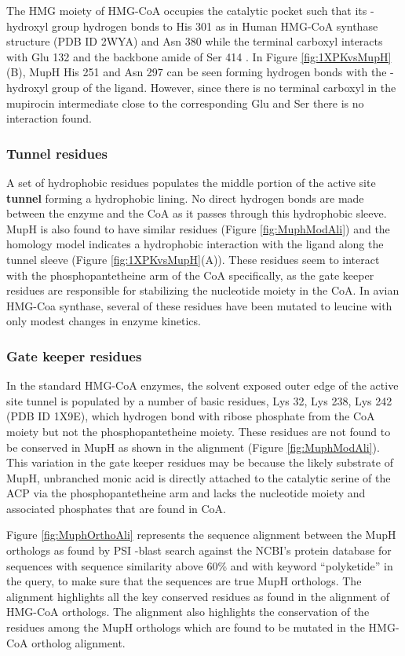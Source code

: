 		The HMG moiety of HMG-CoA occupies the catalytic pocket such that its \bet-hydroxyl group hydrogen bonds to His 301 as in Human HMG-CoA synthase structure (PDB ID 2WYA) and Asn 380 while the terminal carboxyl interacts with Glu 132 and the backbone amide of Ser 414 \parencite{Shafqat2010}. In Figure \ref{fig:1XPKvsMupH}(B), MupH His 251 and Asn 297 can be seen forming hydrogen bonds with the \bet-hydroxyl group of the ligand. However, since there is no terminal carboxyl in the mupirocin intermediate close to the corresponding Glu and Ser there is no interaction found.
		
		\subsubsection{Tunnel residues}
		\label{sec:tunnelresidues}
		A set of hydrophobic residues populates the middle portion of the active site \textbf{tunnel} forming a hydrophobic lining. No direct hydrogen bonds are made between the enzyme and the CoA as it passes through this hydrophobic sleeve. MupH is also found to have similar residues (Figure \ref{fig:MuphModAli}) and the homology model indicates a hydrophobic interaction with the ligand along the tunnel sleeve (Figure \ref{fig:1XPKvsMupH}(A)). These residues seem to interact with the phosphopantetheine arm of the CoA specifically, as the gate keeper residues are responsible for stabilizing the nucleotide moiety in the CoA. In avian HMG-Coa synthase, several of these residues have been mutated to leucine with only modest changes in enzyme kinetics. 
		
		\subsubsection{Gate keeper residues}
		\label{sec:gatekeeperresidues}
		In the standard HMG-CoA enzymes, the solvent exposed outer edge of the active site tunnel is populated by a number of basic residues, Lys 32, Lys 238, Lys 242 (PDB ID 1X9E), which hydrogen bond with ribose phosphate from the CoA moiety but not the phosphopantetheine moiety. These residues are not found to be conserved in MupH as shown in the alignment (Figure \ref{fig:MuphModAli}). This variation in the gate keeper residues may be because the likely substrate of MupH, unbranched monic acid is directly attached to the catalytic serine of the ACP via the phosphopantetheine arm and lacks the nucleotide moiety and associated phosphates that are found in CoA.
		
		Figure \ref{fig:MuphOrthoAli} represents the sequence alignment between the MupH orthologs as found by PSI -blast search against the NCBI's protein database for sequences with sequence similarity above 60\% and with keyword “polyketide” in the query, to make sure that the sequences are true MupH orthologs. The alignment highlights all the key conserved residues as found in the alignment of HMG-CoA orthologs. The alignment also highlights the conservation of the residues among the MupH orthologs which are found to be mutated in the HMG-CoA ortholog alignment.
		
